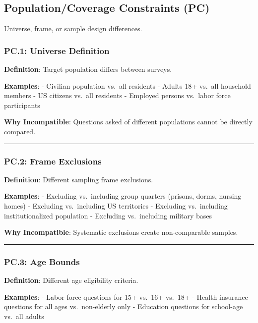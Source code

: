 \documentclass[
  letterpaper,
]{report}
\begin{document}
\subsection{Population/Coverage Constraints
(PC)}\label{populationcoverage-constraints-pc}

Universe, frame, or sample design differences.

\subsubsection{PC.1: Universe
Definition}\label{pc.1-universe-definition}

\textbf{Definition}: Target population differs between surveys.

\textbf{Examples}: - Civilian population vs.~all residents - Adults 18+
vs.~all household members - US citizens vs.~all residents - Employed
persons vs.~labor force participants

\textbf{Why Incompatible}: Questions asked of different populations
cannot be directly compared.

\begin{center}\rule{0.5\linewidth}{0.5pt}\end{center}

\subsubsection{PC.2: Frame Exclusions}\label{pc.2-frame-exclusions}

\textbf{Definition}: Different sampling frame exclusions.

\textbf{Examples}: - Excluding vs.~including group quarters (prisons,
dorms, nursing homes) - Excluding vs.~including US territories -
Excluding vs.~including institutionalized population - Excluding
vs.~including military bases

\textbf{Why Incompatible}: Systematic exclusions create non-comparable
samples.

\begin{center}\rule{0.5\linewidth}{0.5pt}\end{center}

\subsubsection{PC.3: Age Bounds}\label{pc.3-age-bounds}

\textbf{Definition}: Different age eligibility criteria.

\textbf{Examples}: - Labor force questions for 15+ vs.~16+ vs.~18+ -
Health insurance questions for all ages vs.~non-elderly only - Education
questions for school-age vs.~all adults
\end{document}
